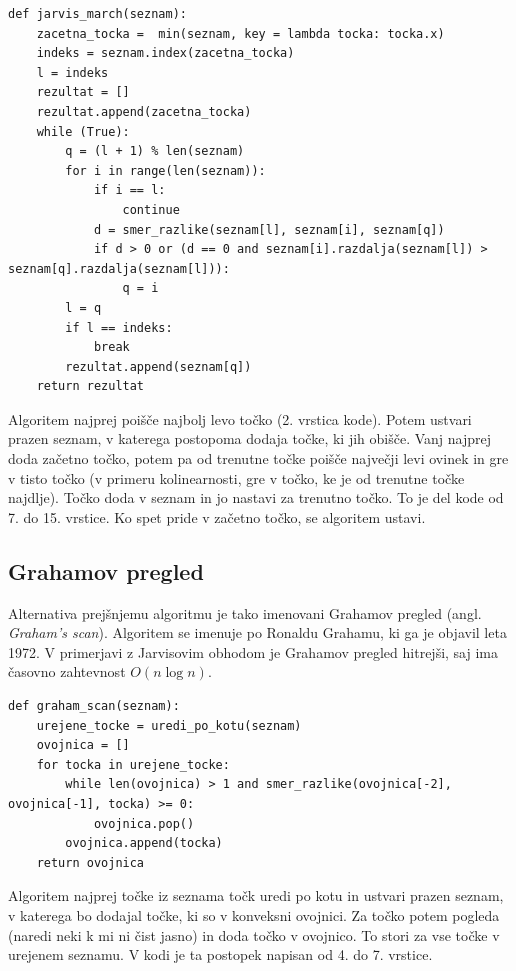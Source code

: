 \documentclass[a4paper]{article}
\begin{document}
\begin{lstlisting}
def jarvis_march(seznam):
    zacetna_tocka =  min(seznam, key = lambda tocka: tocka.x)
    indeks = seznam.index(zacetna_tocka)
    l = indeks
    rezultat = []
    rezultat.append(zacetna_tocka)
    while (True):
        q = (l + 1) % len(seznam)
        for i in range(len(seznam)):
            if i == l:
                continue
            d = smer_razlike(seznam[l], seznam[i], seznam[q])
            if d > 0 or (d == 0 and seznam[i].razdalja(seznam[l]) > seznam[q].razdalja(seznam[l])):
                q = i
        l = q
        if l == indeks:
            break 
        rezultat.append(seznam[q])
    return rezultat
\end{lstlisting}

Algoritem najprej poišče najbolj levo točko (2. vrstica kode). Potem ustvari prazen seznam, v katerega postopoma dodaja točke, ki jih obišče. Vanj najprej doda začetno točko,
potem pa od trenutne točke poišče največji levi ovinek in gre v tisto točko (v primeru kolinearnosti, gre v točko, ke je od trenutne točke najdlje). Točko doda v seznam 
in jo nastavi za trenutno točko. To je del kode od 7. do 15. vrstice. Ko spet pride v začetno točko, se algoritem ustavi.

\subsection{Grahamov pregled}
Alternativa prejšnjemu algoritmu je tako imenovani Grahamov pregled (angl. \textit{Graham's scan}). Algoritem se imenuje po Ronaldu Grahamu, ki ga je objavil leta 1972. 
V primerjavi z Jarvisovim obhodom je Grahamov pregled hitrejši, saj ima časovno zahtevnost $O(n \log n)$.

\begin{lstlisting}
def graham_scan(seznam):
    urejene_tocke = uredi_po_kotu(seznam)
    ovojnica = []
    for tocka in urejene_tocke:
        while len(ovojnica) > 1 and smer_razlike(ovojnica[-2], ovojnica[-1], tocka) >= 0:  
            ovojnica.pop()
        ovojnica.append(tocka)
    return ovojnica
\end{lstlisting}

\newpage
Algoritem najprej točke iz seznama točk uredi po kotu in ustvari prazen seznam, v katerega bo dodajal točke, ki so v konveksni ovojnici. Za točko potem pogleda (naredi neki k mi ni čist
jasno) in doda točko v ovojnico. To stori za vse točke v urejenem seznamu. V kodi je ta postopek napisan od 4. do 7. vrstice.
\end{document}
